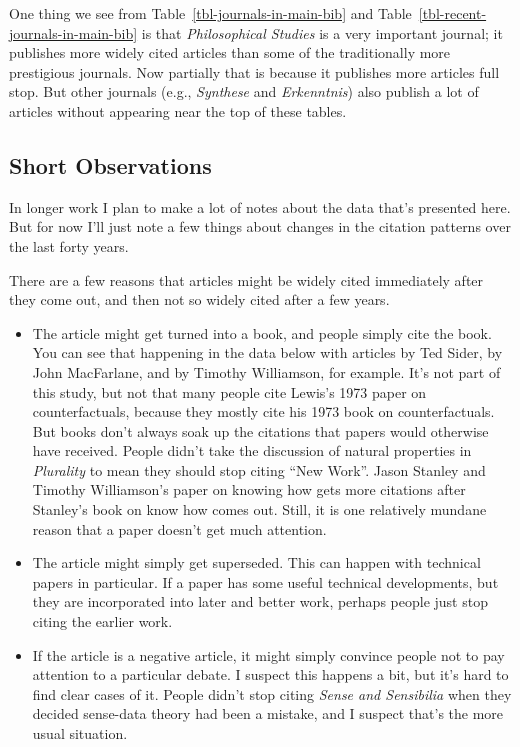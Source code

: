\documentclass[
  10pt,
  letterpaper,
  DIV=11,
  numbers=noendperiod,
  twoside]{scrartcl}
\providecommand{\tightlist}{%
  \setlength{\itemsep}{0pt}\setlength{\parskip}{0pt}}\usepackage{longtable,booktabs,array}
\begin{document}
One thing we see from Table~\ref{tbl-journals-in-main-bib} and
Table~\ref{tbl-recent-journals-in-main-bib} is that \emph{Philosophical
Studies} is a very important journal; it publishes more widely cited
articles than some of the traditionally more prestigious journals. Now
partially that is because it publishes more articles full stop. But
other journals (e.g., \emph{Synthese} and \emph{Erkenntnis}) also
publish a lot of articles without appearing near the top of these
tables.

\subsection{Short Observations}\label{short-observations}

In longer work I plan to make a lot of notes about the data that's
presented here. But for now I'll just note a few things about changes in
the citation patterns over the last forty years.

There are a few reasons that articles might be widely cited immediately
after they come out, and then not so widely cited after a few years.

\begin{itemize}
\tightlist
\item
  The article might get turned into a book, and people simply cite the
  book. You can see that happening in the data below with articles by
  Ted Sider, by John MacFarlane, and by Timothy Williamson, for example.
  It's not part of this study, but not that many people cite Lewis's
  1973 paper on counterfactuals, because they mostly cite his 1973 book
  on counterfactuals. But books don't always soak up the citations that
  papers would otherwise have received. People didn't take the
  discussion of natural properties in \emph{Plurality} to mean they
  should stop citing ``New Work''. Jason Stanley and Timothy
  Williamson's paper on knowing how gets more citations after Stanley's
  book on know how comes out. Still, it is one relatively mundane reason
  that a paper doesn't get much attention.
\item
  The article might simply get superseded. This can happen with
  technical papers in particular. If a paper has some useful technical
  developments, but they are incorporated into later and better work,
  perhaps people just stop citing the earlier work.
\item
  If the article is a negative article, it might simply convince people
  not to pay attention to a particular debate. I suspect this happens a
  bit, but it's hard to find clear cases of it. People didn't stop
  citing \emph{Sense and Sensibilia} when they decided sense-data theory
  had been a mistake, and I suspect that's the more usual situation.
\end{itemize}
\end{document}
